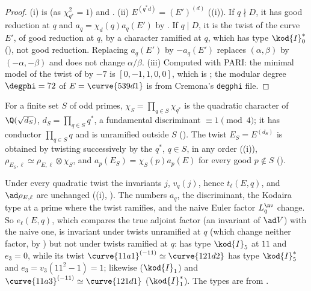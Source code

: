 \begin{proof}
(i) is  (as $\chi_{q^*}^2=1$) and . (ii) $E^{(q^*d)}=(E')^{(d)}$ ((i)). If $q\nmid D$, it has good reduction at $q$ and
$a_q=\chi_d(q)a_q(E')$ by . If $q\mid D$, it is the twist of the curve $E'$, of good reduction at $q$, by a character ramified at $q$, which has type $\kod{I}_0^*$
(), not good reduction. Replacing $a_q(E')$ by $-a_q(E')$ replaces $(\alpha,\beta)$ by $(-\alpha,-\beta)$ and does not change $\alpha/\beta$. (iii) Computed with PARI: the minimal model of the twist
of  by $-7$ is $[0,-1,1,0,0]$, which is ; the modular degree $\degphi=72$ of $E=\curve{539d1}$ is from Cremona's \texttt{degphi} file.
\end{proof}

\begin{definition}\label{def:ellcurves:compositetwist}
For a finite set $S$ of odd primes, $\chi_S=\prod_{q\in S}\chi_{q^*}$ is the quadratic character of $\Q(\sqrt{d_S})$, $d_S=\prod_{q\in S}q^*$, a fundamental discriminant $\equiv1\pmod4$; it has
conductor $\prod_{q\in S}q$ and is unramified outside $S$ (). The twist $E_S=E^{(d_S)}$ is obtained by twisting successively by the $q^*$, $q\in S$, in any order
((i)), $\rho_{E_S,\ell}\simeq\rho_{E,\ell}\otimes\chi_S$, and $a_p(E_S)=\chi_S(p)a_p(E)$ for every good $p\notin S$ ().
\end{definition}

\begin{remark}\label{rem:ellcurves:twistinvariance}
Under every quadratic twist the invariants $j$, $v_q(j)$, hence $t_\ell(E,q)$, and $\ad\rho_{E,\ell}$ are unchanged ((i), ). The numbers $a_q$, the
discriminant, the Kodaira type at a prime where the twist ramifies, and the naive Euler factor $L_q^{\nv}$ change. So $e_\ell(E,q)$, which compares the true adjoint factor (an invariant of $\ad V$)
with the naive one, is invariant under twists unramified at $q$ (which change neither factor, by ) but not under twists ramified at $q$:  has type $\kod{I}_5$ at $11$
and $e_3=0$, while its twist $\curve{11a1}^{(-11)}\simeq\curve{121d2}$ has type $\kod{I}_5^*$ and $e_3=v_3(11^2-1)=1$; likewise  ($\kod{I}_1$) and $\curve{11a3}^{(-11)}\simeq\curve{121d1}$
($\kod{I}_1^*$). The types are from .
\end{remark}


